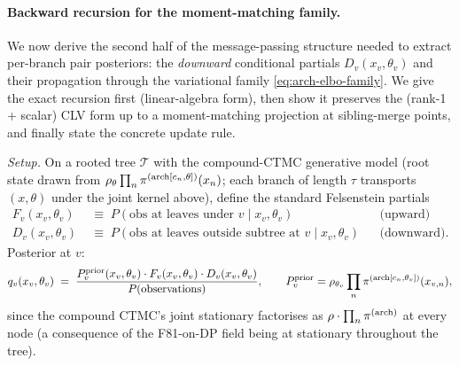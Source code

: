 \paragraph{Backward recursion for the moment-matching family.}
\label{par:arch-phylo-elbo-backward}

We now derive the second half of the message-passing structure needed
to extract per-branch pair posteriors: the \emph{downward} conditional
partials $D_v(x_v, \theta_v)$ and their propagation through the
variational family \eqref{eq:arch-elbo-family}. We give the exact
recursion first (linear-algebra form), then show it preserves the
(rank-1 + scalar) CLV form up to a moment-matching projection at
sibling-merge points, and finally state the concrete update rule.

\emph{Setup.} On a rooted tree $\mathcal{T}$ with the compound-CTMC
generative model (root state drawn from
$\rho_\theta \prod_n \pi^{(\mathrm{arch}[c_n, \theta])}(x_n)$; each branch
of length $\tau$ transports $(x, \theta)$ under the joint kernel
above), define the standard Felsenstein
partials
\begin{align}
F_v(x_v, \theta_v) &\;\equiv\; P(\text{obs at leaves under } v \mid x_v, \theta_v)
    &&\text{(upward)} \\
D_v(x_v, \theta_v) &\;\equiv\; P(\text{obs at leaves outside subtree at } v \mid x_v, \theta_v)
    &&\text{(downward)}.
\end{align}
Posterior at $v$:
\begin{equation}
q_v(x_v, \theta_v) \;=\;
    \frac{ P^{\mathrm{prior}}_v(x_v, \theta_v) \cdot F_v(x_v, \theta_v) \cdot D_v(x_v, \theta_v)}
             {P(\text{observations})},
    \qquad
    P^{\mathrm{prior}}_v = \rho_{\theta_v} \prod_n \pi^{(\mathrm{arch}[c_n, \theta_v])}(x_{v, n}),
    \label{eq:arch-elbo-post}
\end{equation}
since the compound CTMC's joint stationary factorises as
$\rho \cdot \prod_n \pi^{(\mathrm{arch})}$ at every node (a consequence of
the F81-on-DP field being at stationary throughout the tree).


